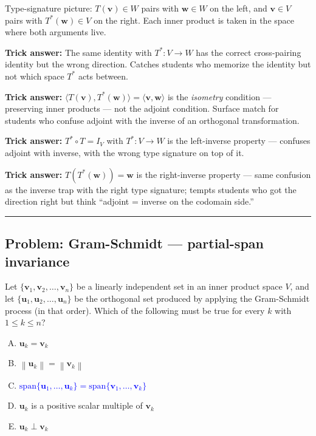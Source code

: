 \documentclass[12pt]{amsart}
\newcommand{\divider}{
  \vspace{-1em}
  \noindent
  \raisebox{-0.15ex}{\textbullet}%
  \hspace{0.5em}%
  \rule[0.5ex]{0.95\textwidth}{1.0pt}%
  \hspace{0.5em}%
  \raisebox{-0.15ex}{\textbullet}%
  \vspace{0em}
}
\newcommand{\norm}[1]{\left\|#1\right\|}
\begin{document}
Type-signature picture: $T(\mathbf{v}) \in W$ pairs with $\mathbf{w} \in W$
on the left, and $\mathbf{v} \in V$ pairs with $T^*(\mathbf{w}) \in V$ on
the right. Each inner product is taken in the space where both arguments
live.

\textbf{Trick answer:}
The same identity with $T^* : V \to W$ has the correct cross-pairing
identity but the wrong direction. Catches students who memorize the
identity but not which space $T^*$ acts between.

\textbf{Trick answer:}
$\langle T(\mathbf{v}), T^*(\mathbf{w}) \rangle = \langle \mathbf{v}, \mathbf{w} \rangle$
is the \emph{isometry} condition --- preserving inner products --- not the
adjoint condition. Surface match for students who confuse adjoint with the
inverse of an orthogonal transformation.

\textbf{Trick answer:}
$T^* \circ T = I_V$ with $T^* : V \to W$ is the left-inverse property ---
confuses adjoint with inverse, with the wrong type signature on top of it.

\textbf{Trick answer:}
$T(T^*(\mathbf{w})) = \mathbf{w}$ is the right-inverse property --- same
confusion as the inverse trap with the right type signature; tempts
students who got the direction right but think ``adjoint = inverse on the
codomain side.''

\divider

\subsection*{Problem: Gram-Schmidt --- partial-span invariance}

Let $\{\mathbf{v}_1, \mathbf{v}_2, \ldots, \mathbf{v}_n\}$ be a linearly
independent set in an inner product space $V$, and let
$\{\mathbf{u}_1, \mathbf{u}_2, \ldots, \mathbf{u}_n\}$ be the orthogonal set
produced by applying the Gram-Schmidt process (in that order). Which of the
following must be true for every $k$ with $1 \leq k \leq n$?

\begin{enumerate}[(A)]
\item $\mathbf{u}_k = \mathbf{v}_k$
\item $\norm{\mathbf{u}_k} = \norm{\mathbf{v}_k}$
\item \textcolor{blue}{\textbf{$\mathrm{span}\{\mathbf{u}_1, \ldots, \mathbf{u}_k\} = \mathrm{span}\{\mathbf{v}_1, \ldots, \mathbf{v}_k\}$}}
\item $\mathbf{u}_k$ is a positive scalar multiple of $\mathbf{v}_k$
\item $\mathbf{u}_k \perp \mathbf{v}_k$
\end{enumerate}
\end{document}
